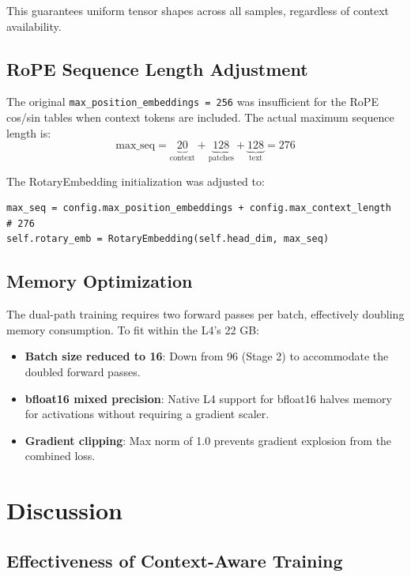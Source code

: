\documentclass[11pt, a4paper]{article}
\begin{document}
This guarantees uniform tensor shapes across all samples, regardless of context availability.

\subsection{RoPE Sequence Length Adjustment}

The original \texttt{max\_position\_embeddings = 256} was insufficient for the RoPE cos/sin tables when context tokens are included. The actual maximum sequence length is:
\[
\text{max\_seq} = \underbrace{20}_{\text{context}} + \underbrace{128}_{\text{patches}} + \underbrace{128}_{\text{text}} = 276
\]

The RotaryEmbedding initialization was adjusted to:
\begin{lstlisting}[style=pythonstyle]
max_seq = config.max_position_embeddings + config.max_context_length  # 276
self.rotary_emb = RotaryEmbedding(self.head_dim, max_seq)
\end{lstlisting}

\subsection{Memory Optimization}

The dual-path training requires two forward passes per batch, effectively doubling memory consumption. To fit within the L4's 22 GB:

\begin{itemize}
    \item \textbf{Batch size reduced to 16}: Down from 96 (Stage 2) to accommodate the doubled forward passes.
    \item \textbf{bfloat16 mixed precision}: Native L4 support for bfloat16 halves memory for activations without requiring a gradient scaler.
    \item \textbf{Gradient clipping}: Max norm of 1.0 prevents gradient explosion from the combined loss.
\end{itemize}

\section{Discussion}

\subsection{Effectiveness of Context-Aware Training}
\end{document}
